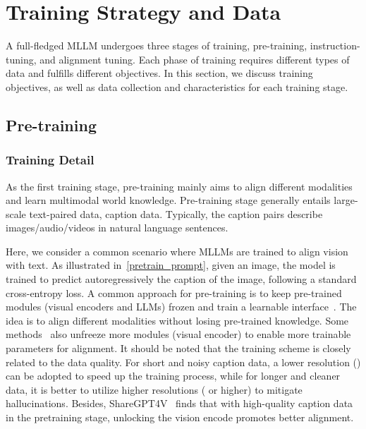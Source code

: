 \section{Training Strategy and Data}
\label{sec:mllm_train}
A full-fledged MLLM undergoes three stages of training, \ie pre-training, instruction-tuning, and alignment tuning. Each phase of training requires different types of data and fulfills different objectives. In this section, we discuss training objectives, as well as data collection and characteristics for each training stage.

\subsection{Pre-training}
\label{sec:train_pre_train}

\subsubsection{Training Detail}
As the first training stage, pre-training mainly aims to align different modalities and learn multimodal world knowledge.
Pre-training stage generally entails large-scale text-paired data, \eg caption data. Typically, the caption pairs describe images/audio/videos in natural language sentences.

Here, we consider a common scenario where MLLMs are trained to align vision with text. As illustrated in~\cref{pretrain_prompt}, given an image, the model is trained to predict autoregressively the caption of the image, following a standard cross-entropy loss.
A common approach for pre-training is to keep pre-trained modules (\eg visual encoders and LLMs) frozen and train a learnable interface~\cite{detgpt, llava, llava-med}. The idea is to align different modalities without losing pre-trained knowledge. Some methods~\cite{mplug-owl,visionllm,bai2023qwen} also unfreeze more modules (\eg visual encoder) to enable more trainable parameters for alignment. 
It should be noted that the training scheme is closely related to the data quality. 
For short and noisy caption data, a lower resolution () can be adopted to speed up the training process, while for longer and cleaner data, it is better to utilize higher resolutions ( or higher) to mitigate hallucinations. 
Besides, ShareGPT4V~\cite{chen2023sharegpt4v} finds that with high-quality caption data in the pretraining stage, unlocking the vision encode promotes better alignment. 

